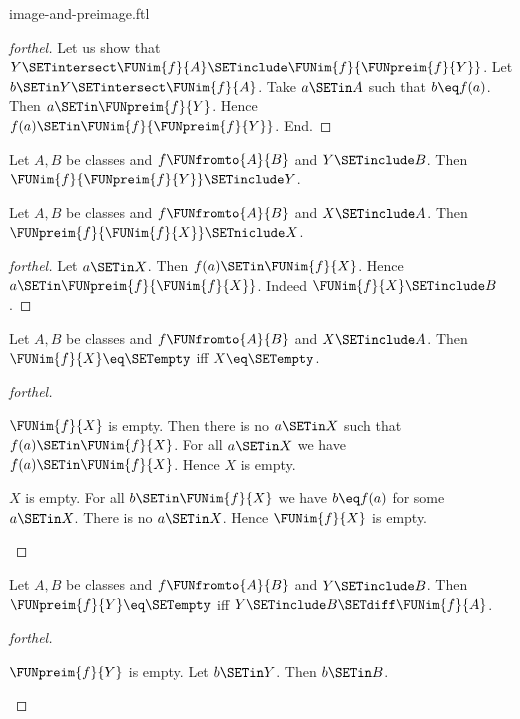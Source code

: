 \documentclass{stex}
\begin{document}
\begin{smodule}{image-and-preimage.ftl}
\begin{proof}[forthel]
  Let us show that $Y \SETintersect \FUNim{f}{A} \SETinclude \FUNim{f}{\FUNpreim{f}{Y}}$.
    Let $b \SETin Y \SETintersect \FUNim{f}{A}$.
    Take $a \SETin A$ such that $b \eq f(a)$.
    Then $a \SETin \FUNpreim{f}{Y}$.
    Hence $f(a) \SETin \FUNim{f}{\FUNpreim{f}{Y}}$.
  End.
\end{proof}

\begin{corollary}[forthel,id=FOUNDATIONS_07_5585105345052672]
  Let $A, B$ be classes and $f \FUNfromto{A}{B}$ and $Y \SETinclude B$.
  Then $\FUNim{f}{\FUNpreim{f}{Y}} \SETinclude Y$.
\end{corollary}

\begin{proposition}[forthel,id=FOUNDATIONS_07_4890896170483712]
  Let $A, B$ be classes and $f \FUNfromto{A}{B}$ and $X \SETinclude A$.
  Then $\FUNpreim{f}{\FUNim{f}{X}} \SETniclude X$.
\end{proposition}
\begin{proof}[forthel]
  Let $a \SETin X$.
  Then $f(a) \SETin \FUNim{f}{X}$.
  Hence $a \SETin \FUNpreim{f}{\FUNim{f}{X}}$.
  Indeed $\FUNim{f}{X} \SETinclude B$.
\end{proof}

\begin{proposition}[forthel,id=FOUNDATIONS_07_3318372355801088]
  Let $A, B$ be classes and $f \FUNfromto{A}{B}$ and $X \SETinclude A$.
  Then $\FUNim{f}{X} \eq \SETempty$ iff $X \eq \SETempty$.
\end{proposition}
\begin{proof}[forthel]
  \begin{case}{$\FUNim{f}{X}$ is empty.}
    Then there is no $a \SETin X$ such that $f(a) \SETin \FUNim{f}{X}$.
    For all $a \SETin X$ we have $f(a) \SETin \FUNim{f}{X}$.
    Hence $X$ is empty.
  \end{case}

  \begin{case}{$X$ is empty.}
    For all $b \SETin \FUNim{f}{X}$ we have $b \eq f(a)$ for some $a \SETin X$.
    There is no $a \SETin X$.
    Hence $\FUNim{f}{X}$ is empty.
  \end{case}
\end{proof}

\begin{proposition}[forthel,id=FOUNDATIONS_07_8597874786959360]
  Let $A, B$ be classes and $f \FUNfromto{A}{B}$ and $Y \SETinclude B$.
  Then $\FUNpreim{f}{Y} \eq \SETempty$ iff $Y \SETinclude B \SETdiff \FUNim{f}{A}$.
\end{proposition}
\begin{proof}[forthel]
  \begin{case}{$\FUNpreim{f}{Y}$ is empty.}
    Let $b \SETin Y$.
    Then $b \SETin B$.


\end{case}
\end{proof}
\end{smodule}
\end{document}
